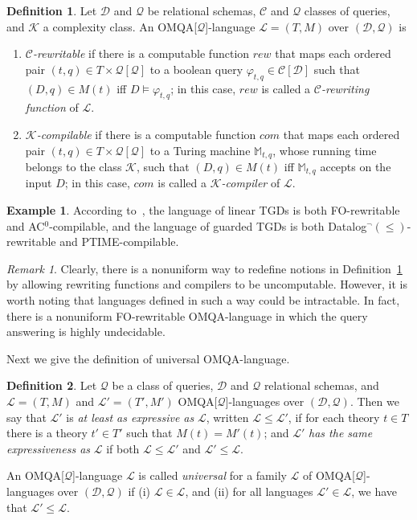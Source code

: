 \documentclass[letterpaper]{article} %
\theoremstyle{definition}
\newtheorem{defn}{Definition}
\theoremstyle{remark}
\newtheorem{rem}{Remark}
\theoremstyle{definition}
\newtheorem{exm}{Example}
\begin{document}
\begin{defn}\label{defn:tractability}
Let $\mathscr{D}$ and $\mathscr{Q}$ be relational schemas, $\mathcal{C}$ and $\mathcal{Q}$ classes of queries, and $\mathcal{K}$ a complexity class. An OMQA[$\mathcal{Q}$]-language $\mathcal{L}=({T},{M})$ over $(\mathscr{D},\mathscr{Q})$ is 
\begin{enumerate}
\item {\em $\mathcal{C}$-rewritable} if there is a computable function $rew$ that maps each ordered pair $(t,{q})\in T\times\mathcal{Q}[\mathscr{Q}]$ to a boolean query $\varphi_{t,{q}}\in\mathcal{C}[\mathscr{D}]$ such that $(D,{q})\in{M}(t)$ iff $D\models\varphi_{t,{q}}$; in this case, $rew$ is called a {\em $\mathcal{C}$-rewriting function} of $\mathcal{L}$.
\item {\em $\mathcal{K}$-compilable} if there is a computable function $com$ that maps each ordered pair $(t,{q})\in T\times\mathcal{Q}[\mathscr{Q}]$ to a Turing machine $\mathds{M}_{t,{q}}$, whose running time belongs to the class $\mathcal{K}$, such that $(D,{q})\in{M}(t)$ iff $\mathds{M}_{t,{q}}$ accepts on the input $D$; in this case, $com$ is called a {\em $\mathcal{K}$-compiler} of $\mathcal{L}$.
\end{enumerate}
\end{defn}

\begin{exm}
According to~\cite{CaliGL12}, the language of linear TGDs is both FO-rewritable and AC$^0$-compilable, and the language of guarded TGDs is both Datalog$^\neg(\le)$-rewritable and PTIME-compilable.
\end{exm}

\begin{rem}
Clearly, there is a nonuniform way to redefine notions in Definition~\ref{defn:tractability} by allowing rewriting functions and compilers to be uncomputable. However, it is worth noting that languages defined in such a way could be intractable. In fact, there is a nonuniform FO-rewritable OMQA-language in which the query answering is highly undecidable.  
\end{rem}

Next we give the definition of universal OMQA-language. 

\begin{defn}
Let $\mathcal{Q}$ be a class of queries, $\mathscr{D}$ and $\mathscr{Q}$ relational schemas, and $\mathcal{L}=({T},{M})$ and $\mathcal{L}'=({T}',{M}')$ OMQA[$\mathcal{Q}$]-languages over $(\mathscr{D},\mathscr{Q})$. Then we say that $\mathcal{L}'$ is {\em at least as expressive as} $\mathcal{L}$, written $\mathcal{L}\le\mathcal{L}'$, if for each theory $t\in T$ there is a theory $t'\in T'$ such that $M(t)=M'(t)$; and $\mathcal{L}'$ {\em has the same expressiveness as} $\mathcal{L}$ if both $\mathcal{L}\le\mathcal{L}'$ and $\mathcal{L}'\le\mathcal{L}$.

An OMQA[$\mathcal{Q}$]-language $\mathcal{L}$ is called {\em universal} for a family $\mathscr{L}$ of  OMQA[$\mathcal{Q}$]-languages over $(\mathscr{D},\mathscr{Q})$ if (i) $\mathcal{L}\in\mathscr{L}$, and (ii) for all languages $\mathcal{L}'\in\mathscr{L}$, we have that $\mathcal{L}'\le\mathcal{L}$. 
\end{defn}
\end{document}
